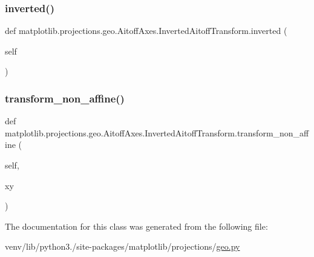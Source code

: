 \subsubsection{\texorpdfstring{inverted()}{inverted()}}
{\footnotesize\ttfamily def matplotlib.\+projections.\+geo.\+Aitoff\+Axes.\+Inverted\+Aitoff\+Transform.\+inverted (\begin{DoxyParamCaption}\item[{}]{self }\end{DoxyParamCaption})}

\mbox{\label{classmatplotlib_1_1projections_1_1geo_1_1AitoffAxes_1_1InvertedAitoffTransform_a73dec1589dcaf97c5b9f0ee4318c6ae4}} 
\subsubsection{\texorpdfstring{transform\+\_\+non\+\_\+affine()}{transform\_non\_affine()}}
{\footnotesize\ttfamily def matplotlib.\+projections.\+geo.\+Aitoff\+Axes.\+Inverted\+Aitoff\+Transform.\+transform\+\_\+non\+\_\+affine (\begin{DoxyParamCaption}\item[{}]{self,  }\item[{}]{xy }\end{DoxyParamCaption})}



The documentation for this class was generated from the following file\+:\begin{DoxyCompactItemize}
\item 
venv/lib/python3./site-\/packages/matplotlib/projections/\hyperlink{geo_8py}{geo.\+py}\end{DoxyCompactItemize}
